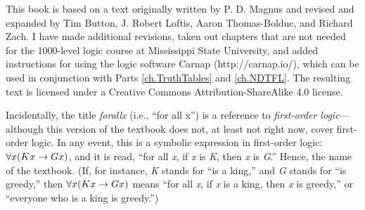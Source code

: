 This book is based on a text originally written by P. D. Magnus and revised and expanded by Tim Button, J. Robert Loftis, Aaron Thomas-Bolduc, and Richard Zach. I have made additional revisions, taken out chapters that are not needed for the 1000-level logic course at Mississippi State University, and added instructions for using the logic software Carnap (http://carnap.io/), which can be used in conjunction with Parts \ref{ch.TruthTables} and \ref{ch.NDTFL}. The resulting text is licensed under a Creative Commons Attribution-ShareAlike 4.0 license.

Incidentally, the title \textit{forall\hspace{.10em}x} (i.e., ``for all x'') is a reference to \textit{first-order logic}---although this version of the textbook does not, at least not right now, cover first-order logic. In any event, this is a symbolic expression in first-order logic: $\forall x(Kx \rightarrow Gx)$, and it is read, “for all \textit{x}, if \textit{x} is \textit{K}, then \textit{x} is \textit{G}.” Hence, the name of the textbook. (If, for instance, \textit{K} stands for ``is a king,'' and \textit{G} stands for ``is greedy,'' then $\forall x(Kx \rightarrow Gx)$ means ``for all \textit{x}, if \textit{x} is a king, then \textit{x} is greedy,'' or ``everyone who is a king is greedy.'') 